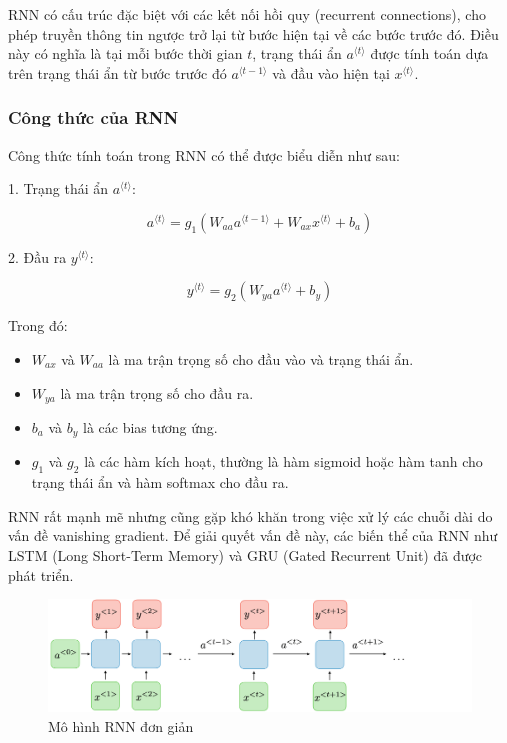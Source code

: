 \documentclass{article}
\begin{document}
\begin{multicols}{2}
RNN có cấu trúc đặc biệt với các kết nối hồi quy (recurrent connections), cho phép truyền thông tin ngược trở lại từ bước hiện tại về các bước trước đó. Điều này có nghĩa là tại mỗi bước thời gian \(t\), trạng thái ẩn \(a^{\langle t \rangle}\) được tính toán dựa trên trạng thái ẩn từ bước trước đó \(a^{\langle t-1 \rangle}\) và đầu vào hiện tại \(x^{\langle t \rangle}\).

\subsubsection{Công thức của RNN}

Công thức tính toán trong RNN có thể được biểu diễn như sau:

1. Trạng thái ẩn \(a^{\langle t \rangle}\):

\[
a^{\langle t \rangle} = g_1 \left( W_{aa} a^{\langle t-1 \rangle} + W_{ax} x^{\langle t \rangle} + b_a \right)
\]

2. Đầu ra \(y^{\langle t \rangle}\):

\[
y^{\langle t \rangle} = g_2 \left( W_{ya} a^{\langle t \rangle} + b_y \right)
\]

Trong đó:
\begin{itemize}
    \item \(W_{ax}\) và \(W_{aa}\) là ma trận trọng số cho đầu vào và trạng thái ẩn.
    \item \(W_{ya}\) là ma trận trọng số cho đầu ra.
    \item \(b_a\) và \(b_y\) là các bias tương ứng.
    \item \(g_1\) và \(g_2\) là các hàm kích hoạt, thường là hàm sigmoid hoặc hàm tanh cho trạng thái ẩn và hàm softmax cho đầu ra.
\end{itemize}

RNN rất mạnh mẽ nhưng cũng gặp khó khăn trong việc xử lý các chuỗi dài do vấn đề vanishing gradient. Để giải quyết vấn đề này, các biến thể của RNN như LSTM (Long Short-Term Memory) và GRU (Gated Recurrent Unit) đã được phát triển.

\begin{figure}
    \centering
    \includegraphics[width=0.5\linewidth]{image.png}
    \caption{Mô hình RNN đơn giản}
    \label{fig:rnn}
\end{figure}


\end{multicols}
\end{document}
